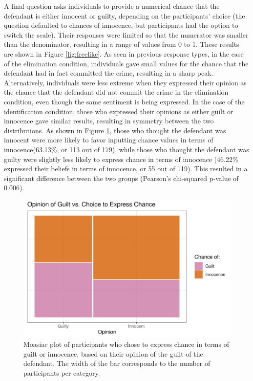 \documentclass[print]{nuthesis}
\begin{document}
A final question asks individuals to provide a numerical chance that the defendant is either innocent or guilty, depending on the participants' choice (the question defaulted to chances of innocence, but participants had the option to switch the scale).
Their responses were limited so that the numerator was smaller than the denominator, resulting in a range of values from 0 to 1.
These results are shown in Figure \ref{fig:freelike}.
As seen in previous response types, in the case of the elimination condition, individuals gave small values for the chance that the defendant had in fact committed the crime, resulting in a sharp peak.
Alternatively, individuals were less extreme when they expressed their opinion as the chance that the defendant did not commit the crime in the elimination condition, even though the same sentiment is being expressed.
In the case of the identification condition, those who expressed their opinions as either guilt or innocence gave similar results, resulting in symmetry between the two distributions.
As shown in Figure \ref{fig:opinionchanceplot}, those who thought the defendant was innocent were more likely to favor inputting chance values in terms of innocence(63.13\%, or 113 out of 179), while those who thought the defendant was guilty were slightly less likely to express chance in terms of innocence (46.22\% expressed their beliefs in terms of innocence, or 55 out of 119).
This resulted in a significant difference between the two groups (Pearson's chi-squared p-value of 0.006).

\begin{figure}

{\centering \includegraphics[width=\linewidth]{thesis_files/figure-latex/opinionchanceplot-1} 

}

\caption{Moasiac plot of participants who chose to express chance in terms of guilt or innocence, based on their opinion of the guilt of the defendant. The width of the bar corresponds to the number of participants per category.}\label{fig:opinionchanceplot}
\end{figure}
\end{document}
